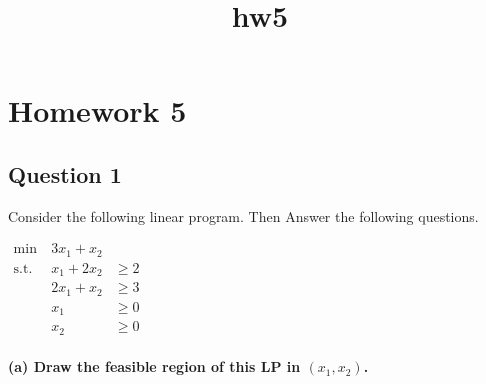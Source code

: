 \documentclass[11pt]{article}
\title{hw5}
\begin{document}
    
    
    \maketitle
    
    

    
    \hypertarget{homework-5}{%
\section{Homework 5}\label{homework-5}}

    \hypertarget{question-1}{%
\subsection{Question 1}\label{question-1}}

Consider the following linear program. Then Answer the following
questions.

\(\begin{aligned} \text{min} & \ 3x_1 + x_2 \\ \text{s.t.} & \ x_1 + 2x_2 & \ge 2 \\  & \ 2x_1 + x_2 & \ge 3 \\  & \ x_1 & \ge 0 \\  & \ x_2 & \ge 0 \end{aligned}\)

    \hypertarget{a-draw-the-feasible-region-of-this-lp-in-x_1-x_2.}{%
\paragraph{\texorpdfstring{(a) Draw the feasible region of this LP in
\((x_1, x_2)\).}{(a) Draw the feasible region of this LP in (x\_1, x\_2).}}\label{a-draw-the-feasible-region-of-this-lp-in-x_1-x_2.}}
\end{document}
